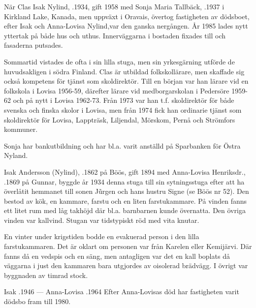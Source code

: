 När Clas Isak Nylind, .1934, gift 1958 med Sonja Maria Tallbäck, .1937 i Kirkland Lake, Kanada, men uppväxt i Oravais, övertog fastigheten av dödsboet, efter Isak och Anna-Lovisa Nylind,var den ganska nergången. År 1985 lades nytt yttertak på både hus och uthus. Innerväggarna i bostaden fixades till och fasaderna putsades.

Sommartid vistades de ofta i sin lilla stuga, men sin yrkesgärning utförde de huvudsakligen i södra Finland. Clas är utbildad folkskollärare, men skaffade sig också kompetens för tjänst som skoldirektör. Till en början var han lärare vid en folkskola i Lovisa 1956-59, därefter lärare vid medborgarskolan i Pedersöre 1959-62 och på nytt i Lovisa 1962-73. Från 1973 var han t.f. skoldirektör för både svenska och finska skolor i Lovisa, men från 1974 fick han ordinarie tjänst som skoldirektör för Lovisa, Lappträsk, Liljendal, Mörskom, Pernå och Strömfors kommuner.

Sonja har bankutbildning och har bl.a. varit anställd på Sparbanken för Östra Nyland.


Isak Andersson (Nylind), .1862 på Böös, gift 1894 med Anna-Lovisa Henriksdr., .1869 på Gunnar, byggde år 1934 denna stuga till sin sytningsstuga efter att ha överlåtit hemmanet till sonen Jũrgen och hans hustru Signe (se Böös nr 52). Den bestod av kök, en kammare, farstu och en liten farstukammare. På vinden fanns ett litet rum med låg takhöjd där bl.a. barnbarnen kunde övernatta. Den övriga vinden var kallvind. Stugan var tidstypiskt röd med vita knutar.

En vinter under krigstiden bodde en evakuerad person i den lilla farstukammaren. Det är oklart om personen var från Karelen eller Kemijärvi. Där fanns då en vedspis och en säng, men antagligen var det en kall boplats då väggarna i just den kammaren bara utgjordes av oisolerad brädvägg. I övrigt var byggnaden av timrad stock.

Isak .1946  --- Anna-Lovisa .1964
Efter Anna-Lovisas död har fastigheten varit dödsbo fram till 1980.
